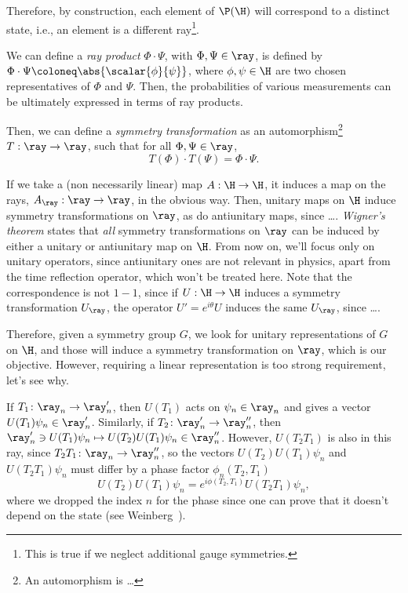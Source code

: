 Therefore, by construction, each element of $\P(\H)$ will correspond to a distinct state, i.e., an element is a different ray\footnote{This is true if we neglect additional gauge symmetries.}.

We can define a \emph{ray product} $\Phi \cdot \Psi$, with $\Phi,\Psi \in \ray$, is defined by $\Phi \cdot \Psi \coloneq \abs{\scalar{\phi}{\psi}}$, where $\phi,\psi \in \H$ are two chosen representatives of $\Phi$ and $\Psi$. Then, the probabilities of various measurements can be ultimately expressed in terms of ray products.

Then, we can define a \emph{symmetry transformation} as an automorphism\footnote{An automorphism is \dots} $T: \ray \to \ray$, such that for all $\Phi,\Psi \in \ray$,
\begin{equation}
    T(\Phi) \cdot T(\Psi) = \Phi \cdot \Psi .
\end{equation}

If we take a (non necessarily linear) map $A: \H \to \H$, it induces a map on the rays, $A_\ray: \ray \to \ray$, in the obvious way. Then, unitary maps on $\H$ induce symmetry transformations on $\ray$, as do antiunitary maps, since \dots. \emph{Wigner's theorem} states that \emph{all} symmetry transformations on $\ray$ can be induced by either a unitary or antiunitary map on $\H$. From now on, we'll focus only on unitary operators, since antiunitary ones are not relevant in physics, apart from the time reflection operator, which won't be treated here. Note that the correspondence is not $1-1$, since if $U: \H \to \H$ induces a symmetry transformation $U_\ray$, the operator $U' = e^{i\theta}U$ induces the same $U_\ray$, since \dots.

Therefore, given a symmetry group $G$, we look for unitary representations of $G$ on $\H$, and those will induce a symmetry transformation on $\ray$, which is our objective. However, requiring a linear representation is too strong requirement, let's see why.

If $T_1 \colon \ray_n \to \ray'_n$, then $U(T_1)$ acts on $\psi_n \in \ray_n$ and gives a vector $U(T_1)\psi_n \in \ray'_n$. Similarly, if $T_2 \colon \ray'_n \to \ray''_n$, then $\ray'_n \ni U(T_1)\psi_n \mapsto U(T_2)U(T_1)\psi_n \in \ray''_n$. However, $U(T_2 T_1)$ is also in this ray, since $T_2 T_1 \colon \ray_n \to \ray''_n$, so the vectors $U(T_2)U(T_1)\psi_n$ and $U(T_2T_1)\psi_n$ must differ by a phase factor $\phi_n (T_2, T_1)$
\begin{equation}
    U(T_2)U(T_1)\psi_n = e^{i\phi (T_2, T_1)} U(T_2T_1)\psi_n ,
\end{equation}
where we dropped the index $n$ for the phase since one can prove that it doesn't depend on the state (see Weinberg~\cite{weinberg}).

